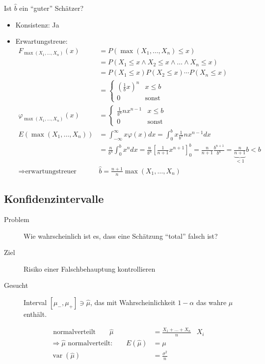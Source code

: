 \documentclass[10pt,a4paper]{scrartcl}
\DeclareMathOperator{\var}{var}
\begin{document}
Ist $\hat{b}$ ein ``guter'' Schätzer?
\begin{itemize}
\item Konsistenz: Ja
\item Erwartungstreue: 
\begin{align*}
F_{\max(X_1, \dots, X_n)} (x) & = P(\max(X_1, \dots, X_n) \le x) \\
                             &= P(X_1 \le x \wedge X_2 \le x \wedge \dots \wedge X_n \le x) \\
                             &= P(X_1 \le x)P(X_2 \le x)\cdots P(X_n \le x) \\
                             &= \begin{cases} \left(\frac{1}{b} x\right)^n & x \le b \\ 0 & \text{sonst} \end{cases}\\
\varphi_{\max(X_1, \dots, X_n)}(x) &= \begin{cases} \frac{1}{b^n} nx^{n-1} & x \le b \\ 0 & \text{sonst} \end{cases} \\
E(\max(X_1, \dots, X_n)) &= \int_{-\infty}^\infty x\varphi(x) dx = \int_0^b x \frac{1}{b^n}n x^{n-1}dx \\
                         &= \frac{n}{b^n}\int_0^b x^n dx = \frac{n}{b^n}\left[\frac{1}{n+1}x^{n+1}\right]_0^b 
                          = \frac{n}{n+1} \frac{b^{n+1}}{b^n} = \underbrace{\frac{n}{n+1}}_{<1}b < b \\
\Rightarrow \text{erwartungstreuer Schätzer: } & \hat{b} = \frac{n+1}{n} \max(X_1, \dots, X_n)
\end{align*} 
\end{itemize}
\fi

\subsection{Konfidenzintervalle}
\begin{description}
\item[Problem] Wie wahrscheinlich ist es, dass eine Schätzung ``total'' falsch ist?
\item[Ziel] Risiko einer Falschbehauptung kontrollieren
\item[Gesucht] Interval $[\mu_{-}, \mu_{+}] \ni \hat{\mu}$, das mit Wahrscheinlichkeit $1-\alpha$ das wahre $\mu$ enthält.
\end{description}

\begin{align*}
   \text{ normalverteilt} \qquad \hat{\mu} &= \frac{X_1 + \dots + X_n}{n} & X_i\\
  \Rightarrow \hat{\mu} \text{ normalverteilt:} \qquad
   E(\hat{\mu}) & = \mu \\
  \var(\hat{\mu}) &= \frac{\sigma^2}{n}
\end{align*}
\end{document}
